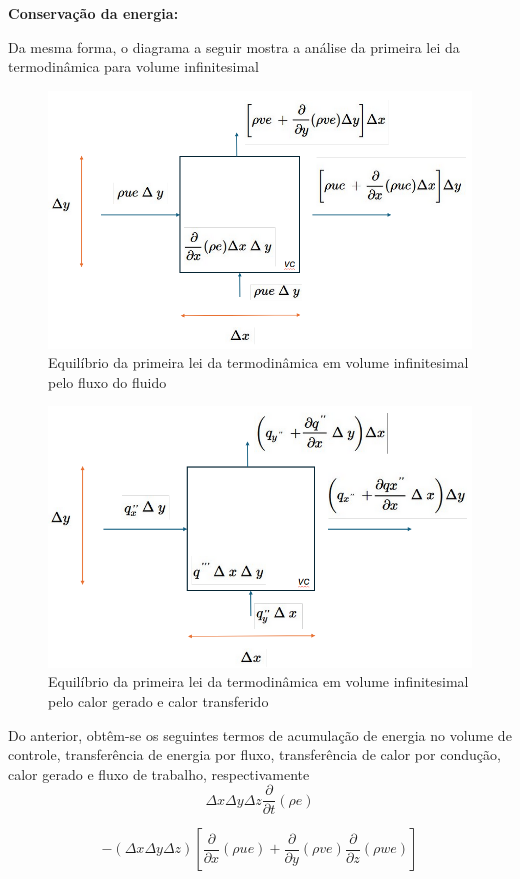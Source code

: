 \documentclass[]{article}
\begin{document}
\textbf{Conservação da energia:} 

Da mesma forma, o diagrama a seguir mostra a análise da primeira lei da termodinâmica para volume infinitesimal

\begin{figure}[H]
	\centering
	\includegraphics[width=.65\textwidth]{Figures/1_4}
	\caption{Equilíbrio da primeira lei da termodinâmica em volume infinitesimal pelo fluxo do fluido}
\end{figure}

\begin{figure}[H]
	\centering
	\includegraphics[width=.65\textwidth]{Figures/1_5}
	\caption{Equilíbrio da primeira lei da termodinâmica em volume infinitesimal pelo calor gerado e calor transferido}
\end{figure}

Do anterior, obtêm-se os seguintes termos de acumulação de energia no volume de controle, transferência de energia por fluxo, transferência de calor por condução, calor gerado e fluxo de trabalho, respectivamente
\begin{equation}
	 \Delta x \Delta y  \Delta z \frac{\partial}{\partial t} (\rho e)
\end{equation}

\begin{equation}
	 - (\Delta x \Delta y \Delta z) 
	\left[ \frac{\partial}{\partial x} (\rho u e) + \frac{\partial}{\partial y} (\rho v e) \frac{\partial}{\partial z} (\rho w e)\right]
\end{equation}
\end{document}
